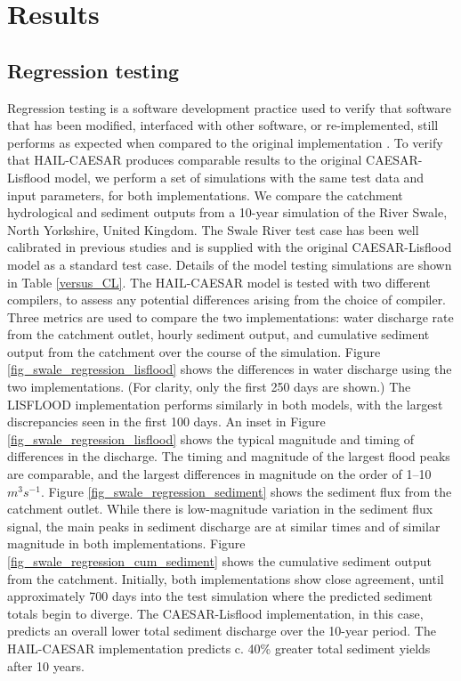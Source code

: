 \section{Results}

\subsection{Regression testing}

Regression testing is a software development practice used to verify that software that has been modified, interfaced with other software, or re-implemented, still performs as expected when compared to the original implementation \citep{wong1997study}. To verify that HAIL-CAESAR produces comparable results to the original CAESAR-Lisflood model, we perform a set of simulations with the same test data and input parameters, for both implementations. We compare the catchment hydrological and sediment outputs from a 10-year simulation of the River Swale, North Yorkshire, United Kingdom. The Swale River test case has been well calibrated in previous studies \citep[e.g.,][]{Coulthard2001} and is supplied with the original CAESAR-Lisflood model as a standard test case. Details of the model testing simulations are shown in Table \ref{versus_CL}. The HAIL-CAESAR model is tested with two different compilers, to assess any potential differences arising from the choice of compiler. Three metrics are used to compare the two implementations: water discharge rate from the catchment outlet, hourly sediment output, and cumulative sediment output from the catchment over the course of the simulation. 
Figure \ref{fig_swale_regression_lisflood} shows the differences in water discharge using the two implementations. (For clarity, only the first 250 days are shown.) The LISFLOOD implementation performs similarly in both models, with the largest discrepancies seen in the first 100 days. An inset in Figure \ref{fig_swale_regression_lisflood} shows the typical magnitude and timing of differences in the discharge. The timing and magnitude of the largest flood peaks are comparable, and the largest differences in magnitude on the order of 1--10 \(m^3s^{-1}\).
Figure \ref{fig_swale_regression_sediment} shows the sediment flux from the catchment outlet. While there is low-magnitude variation in the sediment flux signal, the main peaks in sediment discharge are at similar times and of similar magnitude in both implementations. Figure \ref{fig_swale_regression_cum_sediment} shows the cumulative sediment output from the catchment. Initially, both implementations show close agreement, until approximately 700 days into the test simulation where the predicted sediment totals begin to diverge. The CAESAR-Lisflood implementation, in this case, predicts an overall lower total sediment discharge over the 10-year period. The HAIL-CAESAR implementation predicts c. 40\% greater total sediment yields after 10 years. 

